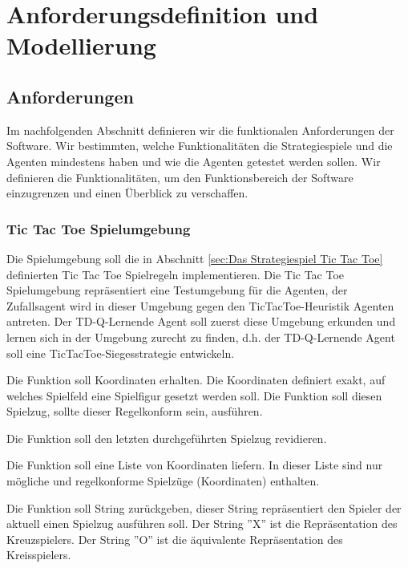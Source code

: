 \chapter{Anforderungsdefinition und Modellierung}
\label{cha:Anforderungsdefinition und Modellierung}


\section{Anforderungen}
\label{sec:Anforderungen}
Im nachfolgenden Abschnitt definieren wir die funktionalen Anforderungen der Software. Wir bestimmten, welche Funktionalitäten die Strategiespiele und die Agenten mindestens haben und wie die Agenten getestet werden sollen. Wir definieren die Funktionalitäten, um den Funktionsbereich der Software einzugrenzen und einen Überblick zu verschaffen.

\subsection{Tic Tac Toe Spielumgebung}
Die Spielumgebung soll die in Abschnitt \ref{sec:Das Strategiespiel Tic Tac Toe} definierten Tic Tac Toe Spielregeln implementieren. Die Tic Tac Toe Spielumgebung repräsentiert eine Testumgebung für die Agenten, der Zufallsagent wird in dieser Umgebung gegen den TicTacToe-Heuristik Agenten antreten. Der TD-Q-Lernende Agent soll zuerst diese Umgebung erkunden und lernen sich in der Umgebung zurecht zu finden, d.h. der TD-Q-Lernende Agent soll eine TicTacToe-Siegesstrategie entwickeln. 

Die Funktion soll Koordinaten erhalten. Die Koordinaten definiert exakt, auf welches Spielfeld eine Spielfigur gesetzt werden soll. Die Funktion soll diesen Spielzug, sollte dieser Regelkonform sein, ausführen.

Die Funktion soll den letzten durchgeführten Spielzug revidieren.

Die Funktion soll eine Liste von Koordinaten liefern. In dieser Liste sind nur mögliche und regelkonforme Spielzüge (Koordinaten) enthalten.

Die Funktion soll String zurückgeben, dieser String repräsentiert den Spieler der aktuell einen Spielzug ausführen soll. Der String ''X'' ist die Repräsentation des Kreuzspielers. Der String ''O'' ist die äquivalente Repräsentation des Kreisspielers.

